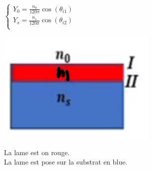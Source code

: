 \documentclass[12pt]{book}
\begin{document}
            \begin{center}
                 \vspace*{20px}
                 \\
                \begin{minipage}{0.3\linewidth}
                    $\begin{cases}
                        Y_0 = \frac{n_0}{120\pi}\cos(\theta_{i1}) \\
                        Y_s = \frac{n_s}{120\pi}\cos(\theta_{i2}) \\
                    \end{cases}$
                \end{minipage}
                \begin{minipage}{0.2\linewidth}
                    \includegraphics[width=\linewidth]{pic/lametopofshit.png}\\

                \end{minipage}
                \begin{minipage}{0.29\linewidth}
                    La lame est on rouge. \\
                    La lame est pose sur la substrat en blue.
                \end{minipage}
            \end{center}
\end{document}
